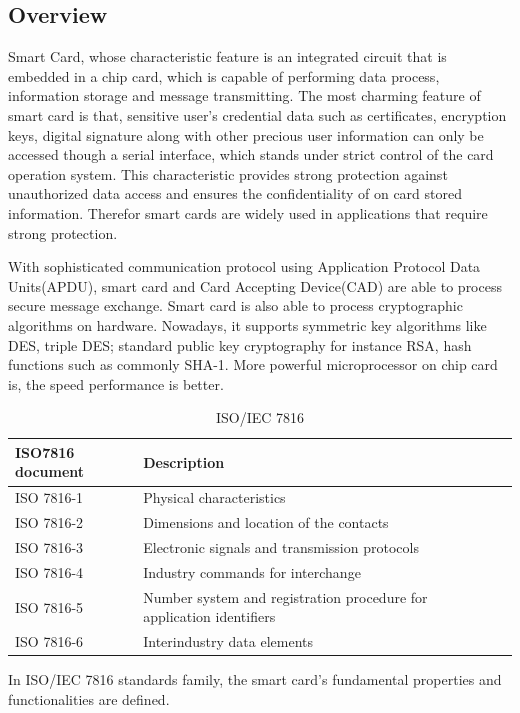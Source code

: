\subsection{Overview}
Smart Card, whose characteristic feature is an integrated circuit that is embedded in a chip card, which is capable of performing data process, information storage and message transmitting\cite{handbuch}. The most charming feature of smart card is that, sensitive user's credential data such as certificates, encryption keys, digital signature along with other precious user information can only be accessed though a serial interface, which stands under  strict control of the card operation system. This characteristic provides strong  protection against  unauthorized data access and ensures the confidentiality of on card stored information. Therefor smart cards are widely used in applications that require strong protection.

With sophisticated communication protocol using Application Protocol Data Units(APDU), smart card and Card Accepting Device(CAD) are able to process secure message exchange. Smart card is also able to process cryptographic algorithms on hardware. Nowadays, it supports symmetric key algorithms like DES, triple DES; standard public key cryptography for instance RSA, hash functions such as commonly SHA-1\cite{handbuch}. More powerful microprocessor on chip card is, the speed performance is better.  

\begin{table}[ht]
\caption{ISO/IEC 7816\cite{handbuch}}
\centering
\begin{tabular}{lllll}
 ISO7816 document & Description  \\[1ex]
\hline\hline
 ISO 7816-1&Physical characteristics   \\
ISO 7816-2&Dimensions and location of the contacts   \\
 ISO 7816-3& Electronic signals and transmission protocols   \\
ISO 7816-4&Industry commands for interchange  \\
ISO 7816-5& Number system and registration procedure for application identifiers \\
ISO 7816-6& Interindustry data elements  \\
\hline
\end{tabular}
\label{table:ISO7816}
\end{table}

In ISO/IEC 7816 standards family,  the smart card's fundamental properties and functionalities are defined.

